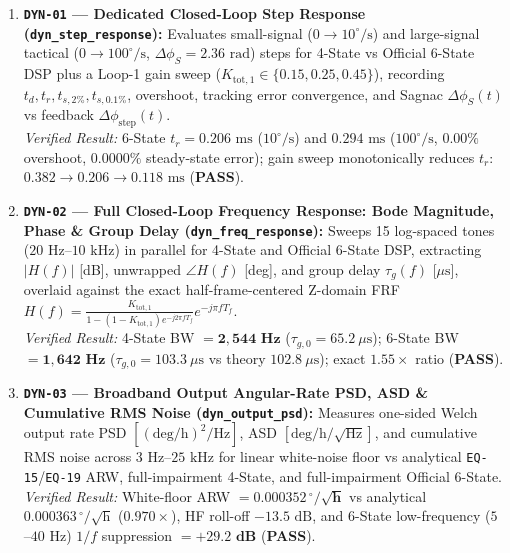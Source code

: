 \documentclass[11pt,a4paper]{article}
\begin{document}
\begin{enumerate}
    \item \textbf{\texttt{DYN-01} --- Dedicated Closed-Loop Step Response (\texttt{dyn\_step\_response}):}
    Evaluates small-signal ($0 \to 10^\circ/\text{s}$) and large-signal tactical ($0 \to 100^\circ/\text{s}$, $\Delta\phi_S = 2.36\text{ rad}$) steps for 4-State vs Official 6-State DSP plus a Loop-1 gain sweep ($K_{\text{tot},1} \in \{0.15, 0.25, 0.45\}$), recording $t_d, t_r, t_{s,2\%}, t_{s,0.1\%}$, overshoot, tracking error convergence, and Sagnac $\Delta\phi_S(t)$ vs feedback $\Delta\phi_{\text{step}}(t)$.\\
    \emph{Verified Result:} 6-State $t_r = 0.206\text{ ms}$ ($10^\circ/\text{s}$) and $0.294\text{ ms}$ ($100^\circ/\text{s}$, $0.00\%$ overshoot, $0.0000\%$ steady-state error); gain sweep monotonically reduces $t_r$: $0.382 \to 0.206 \to 0.118\text{ ms}$ (\textbf{PASS}).

    \item \textbf{\texttt{DYN-02} --- Full Closed-Loop Frequency Response: Bode Magnitude, Phase \& Group Delay (\texttt{dyn\_freq\_response}):}
    Sweeps 15 log-spaced tones ($20\text{ Hz}$--$10\text{ kHz}$) in parallel for 4-State and Official 6-State DSP, extracting $|H(f)|$ [dB], unwrapped $\angle H(f)$ [deg], and group delay $\tau_g(f)$ [$\mu\text{s}$], overlaid against the exact half-frame-centered Z-domain FRF $H(f) = \frac{K_{\text{tot},1}}{1 - (1-K_{\text{tot},1})e^{-j2\pi f T_f}} e^{-j\pi f T_f}$.\\
    \emph{Verified Result:} 4-State BW $= \mathbf{2{,}544\text{ Hz}}$ ($\tau_{g,0} = 65.2\ \mu\text{s}$); 6-State BW $= \mathbf{1{,}642\text{ Hz}}$ ($\tau_{g,0} = 103.3\ \mu\text{s}$ vs theory $102.8\ \mu\text{s}$); exact $1.55\times$ ratio (\textbf{PASS}).

    \item \textbf{\texttt{DYN-03} --- Broadband Output Angular-Rate PSD, ASD \& Cumulative RMS Noise (\texttt{dyn\_output\_psd}):}
    Measures one-sided Welch output rate PSD $[(\text{deg/h})^2/\text{Hz}]$, ASD $[\text{deg/h}/\sqrt{\text{Hz}}]$, and cumulative RMS noise across $3\text{ Hz}$--$25\text{ kHz}$ for linear white-noise floor vs analytical \texttt{EQ-15}/\texttt{EQ-19} ARW, full-impairment 4-State, and full-impairment Official 6-State.\\
    \emph{Verified Result:} White-floor ARW $= \mathbf{0.000352\,^\circ/\sqrt{\text{h}}}$ vs analytical $0.000363\,^\circ/\sqrt{\text{h}}$ ($0.970\times$), HF roll-off $-13.5\text{ dB}$, and 6-State low-frequency ($5$--$40\text{ Hz}$) $1/f$ suppression $= \mathbf{+29.2\text{ dB}}$ (\textbf{PASS}).


\end{enumerate}
\end{document}
